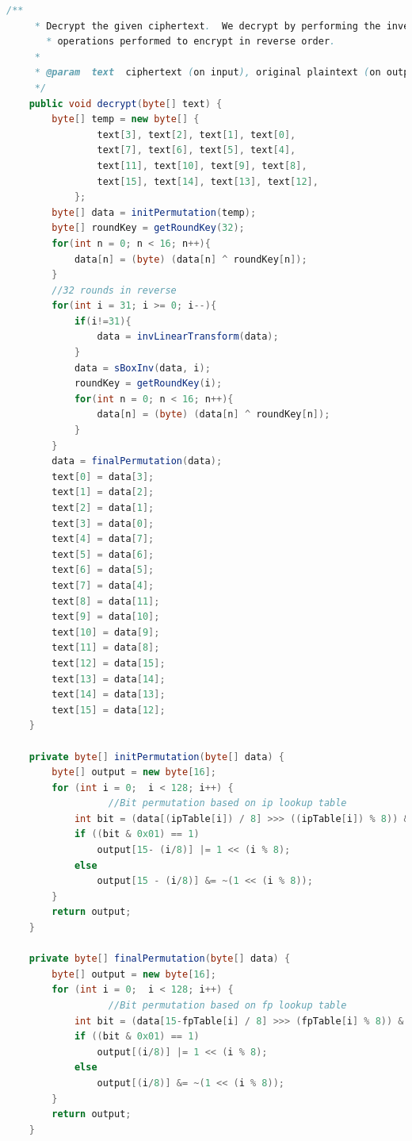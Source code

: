 \documentclass[12pt]{article} %
\begin{document}
\begin{lstlisting}[language=Java, basicstyle=\small, breaklines=true]
    /**
     * Decrypt the given ciphertext.  We decrypt by performing the inverse
	   * operations performed to encrypt in reverse order.
     *
     * @param  text  ciphertext (on input), original plaintext (on output).
     */
    public void decrypt(byte[] text) {
        byte[] temp = new byte[] {
                text[3], text[2], text[1], text[0],
                text[7], text[6], text[5], text[4],
                text[11], text[10], text[9], text[8],
                text[15], text[14], text[13], text[12],
            };
        byte[] data = initPermutation(temp);
        byte[] roundKey = getRoundKey(32);
        for(int n = 0; n < 16; n++){
            data[n] = (byte) (data[n] ^ roundKey[n]);
        }
        //32 rounds in reverse
        for(int i = 31; i >= 0; i--){
            if(i!=31){
                data = invLinearTransform(data);
            }
            data = sBoxInv(data, i);
            roundKey = getRoundKey(i);
            for(int n = 0; n < 16; n++){
                data[n] = (byte) (data[n] ^ roundKey[n]);
            }
        }
        data = finalPermutation(data);   
        text[0] = data[3];
        text[1] = data[2];
        text[2] = data[1];
        text[3] = data[0];
        text[4] = data[7];
        text[5] = data[6];
        text[6] = data[5];
        text[7] = data[4];
        text[8] = data[11];
        text[9] = data[10];
        text[10] = data[9];
        text[11] = data[8];
        text[12] = data[15];
        text[13] = data[14];
        text[14] = data[13];
        text[15] = data[12];
    }

    private byte[] initPermutation(byte[] data) {
        byte[] output = new byte[16];
        for (int i = 0;  i < 128; i++) {
			      //Bit permutation based on ip lookup table
            int bit = (data[(ipTable[i]) / 8] >>> ((ipTable[i]) % 8)) & 0x01;
            if ((bit & 0x01) == 1)
                output[15- (i/8)] |= 1 << (i % 8);
            else
                output[15 - (i/8)] &= ~(1 << (i % 8));
        }
        return output; 
    }

    private byte[] finalPermutation(byte[] data) {
        byte[] output = new byte[16];
        for (int i = 0;  i < 128; i++) {
			      //Bit permutation based on fp lookup table
            int bit = (data[15-fpTable[i] / 8] >>> (fpTable[i] % 8)) & 0x01;
            if ((bit & 0x01) == 1)
                output[(i/8)] |= 1 << (i % 8);
            else
                output[(i/8)] &= ~(1 << (i % 8));
        }
        return output; 
    }


\end{lstlisting}
\end{document}
